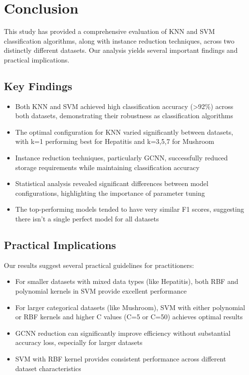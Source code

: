 \section{Conclusion}
\label{sec:conclusion}

This study has provided a comprehensive evaluation of KNN and SVM classification algorithms, along with instance reduction techniques, across two distinctly different datasets. Our analysis yields several important findings and practical implications.

\subsection{Key Findings}

\begin{itemize}
    \item Both KNN and SVM achieved high classification accuracy (\textgreater 92\%) across both datasets, demonstrating their robustness as classification algorithms
    \item The optimal configuration for KNN varied significantly between datasets, with k=1 performing best for Hepatitis and k=3,5,7 for Mushroom
    \item Instance reduction techniques, particularly GCNN, successfully reduced storage requirements while maintaining classification accuracy
    \item Statistical analysis revealed significant differences between model configurations, highlighting the importance of parameter tuning
    \item The top-performing models tended to have very similar F1 scores, suggesting there isn't a single perfect model for all datasets
\end{itemize}

\subsection{Practical Implications}

Our results suggest several practical guidelines for practitioners:
\begin{itemize}
    \item For smaller datasets with mixed data types (like Hepatitis), both RBF and polynomial kernels in SVM provide excellent performance
    \item For larger categorical datasets (like Mushroom), SVM with either polynomial or RBF kernels and higher C values (C=5 or C=50) achieves optimal results
    \item GCNN reduction can significantly improve efficiency without substantial accuracy loss, especially for larger datasets
    \item SVM with RBF kernel provides consistent performance across different dataset characteristics
\end{itemize}


